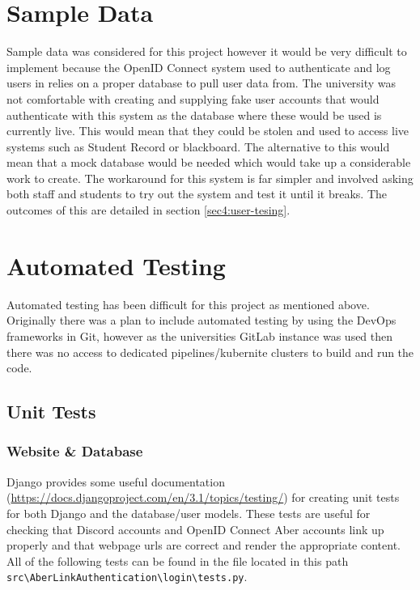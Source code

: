 
\section{Sample Data}
Sample data was considered for this project however it would be very difficult to implement because the OpenID Connect \cite{OpenID} system used to authenticate and log users in relies on a proper database to pull user data from. The university was not comfortable with creating and supplying fake user accounts that would authenticate with this system as the database where these would be used is currently live. This would mean that they could be stolen and used to access live systems such as Student Record or blackboard. The alternative to this would mean that a mock database would be needed which would take up a considerable work to create. The workaround for this system is far simpler and involved asking both staff and students to try out the system and test it until it breaks. The outcomes of this are detailed in section \ref{sec4:user-tesing}.

\section{Automated Testing}
Automated testing has been difficult for this project as mentioned above. Originally there was a plan to include automated testing by using the DevOps frameworks in Git, however as the universities GitLab instance was used then there was no access to dedicated pipelines/kubernite clusters to build and run the code.  

\subsection{Unit Tests}

\subsubsection{Website \& Database}\label{sec4:unit-web}
Django provides some useful documentation (\href{https://docs.djangoproject.com/en/3.1/topics/testing/}{https://docs.djangoproject.com/en/3.1/topics/testing/}) for creating unit tests for both Django and the database/user models. These tests are useful for checking that Discord accounts and OpenID Connect \cite{OpenID} Aber accounts link up properly and that webpage urls are correct and render the appropriate content. All of the following tests can be found in the file located in this path \verb|src\AberLinkAuthentication\login\tests.py|. 

